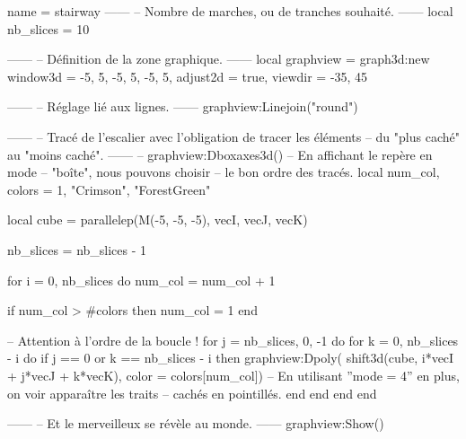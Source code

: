 \documentclass[border = 3pt]{standalone}
\begin{document}
\begin{luadraw}{name = stairway}
------
-- Nombre de marches, ou de tranches souhaité.
------
    local nb_slices = 10

------
-- Définition de la zone graphique.
------
    local graphview = graph3d:new{
        window3d = {-5, 5, -5, 5, -5, 5},
        adjust2d = true,
        viewdir  = {-35, 45}
    }

------
-- Réglage lié aux lignes.
------
    graphview:Linejoin("round")

------
-- Tracé de l'escalier avec l'obligation de tracer les éléments
-- du "plus caché" au "moins caché".
------
--    graphview:Dboxaxes3d()  -- En affichant le repère en mode
                              -- "boîte", nous pouvons choisir
                              -- le bon ordre des tracés.
    local num_col, colors = 1, {"Crimson", "ForestGreen"}

    local cube = parallelep(M(-5, -5, -5), vecI, vecJ, vecK)

	nb_slices = nb_slices - 1

    for i = 0, nb_slices do
        num_col = num_col + 1

        if num_col > #colors then
            num_col = 1
        end

-- Attention à l'ordre de la boucle !
        for j = nb_slices, 0, -1 do
            for k = 0, nb_slices - i do
                if j == 0 or k == nb_slices - i then
                    graphview:Dpoly(
                        shift3d(cube, i*vecI + j*vecJ + k*vecK),
                        {color = colors[num_col]})
-- En utilisant ''mode = 4'' en plus, on voir apparaître les traits
-- cachés en pointillés.
                end
            end
        end
    end

------
-- Et le merveilleux se révèle au monde.
------
    graphview:Show()
\end{luadraw}
\end{document}
